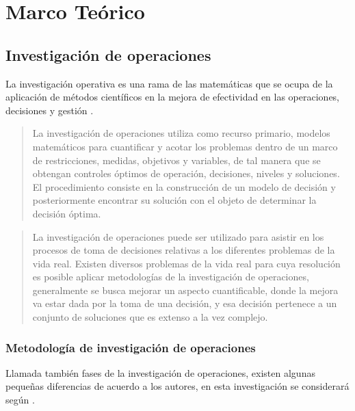
%   
\section{Marco Teórico}
\subsection{Investigación de operaciones}
La investigación operativa es una rama de las matemáticas que se ocupa de la aplicación de métodos científicos en la mejora de efectividad en las operaciones, decisiones y gestión \cite{Ramos2010ModelosOptimizacion}. 
\begin{quote}La investigación de operaciones utiliza como recurso primario, modelos matemáticos para cuantificar y acotar los problemas dentro de un marco de restricciones, medidas, objetivos y variables, de tal manera que se obtengan controles óptimos de operación, decisiones, niveles y soluciones. El procedimiento consiste en la construcción de un modelo de decisión y posteriormente encontrar su solución con el objeto de determinar la decisión óptima. \cite{RinconAbril2001InvestigacionEmpresas} \end{quote}

\begin{quote}La investigación de operaciones puede ser utilizado para asistir en los procesos de toma de decisiones relativas a los diferentes problemas de la vida real. Existen diversos problemas de la vida real para cuya resolución es posible aplicar metodologías de la investigación de operaciones, generalmente se busca mejorar un aspecto cuantificable, donde la mejora va estar dada por la toma de una decisión, y esa decisión pertenece a un conjunto de soluciones que es extenso a la vez complejo.\cite{Mauttone2014QueYouTube}\end{quote}
\subsubsection{Metodología de investigación de operaciones}
Llamada también fases de la investigación de operaciones, existen algunas pequeñas diferencias de acuerdo a los autores, en esta investigación se considerará según  . \cite{CabreraGarcia2013IntroduccionYouTube,Hillier2010IntroduccionOperaciones, Williams2013ModelProgramming}

